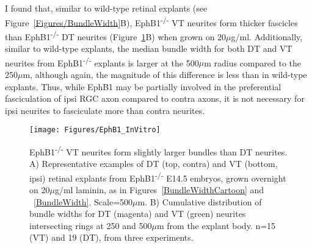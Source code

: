 I found that, similar to wild-type retinal explants (see Figure~\ref{Figures/BundleWidth}B), EphB1\textsuperscript{-/-} VT neurites form thicker fascicles than EphB1\textsuperscript{-/-} DT neurites (Figure~\ref{EphB1InVitro}B) when grown on 20$\mu$g/ml.
Additionally, similar to wild-type explants, the median bundle width for both DT and VT neurites from EphB1\textsuperscript{-/-} explants is larger at the 500$\mu$m radius compared to the 250$\mu$m, although again, the magnitude of this difference is less than in wild-type explants.
Thus, while EphB1 may be partially involved in the preferential fasciculation of ipsi RGC axon compared to contra axons, it is not necessary for ipsi neurites to fasciculate more than contra neurites.
\begin{figure}[hbtp]
    \begin{center}
        \texttt{[image: Figures/EphB1\_InVitro]}
        \caption[EphB1\textsuperscript{-/-} VT neurites form slightly larger bundles than DT neurites.]
        {EphB1\textsuperscript{-/-} VT neurites form slightly larger bundles than DT neurites.
        A) Representative examples of DT (top, contra) and VT (bottom, ipsi) retinal explants from EphB1\textsuperscript{-/-} E14.5 embryos, grown overnight on 20$\mu$g/ml laminin, as in Figures~\ref{BundleWidthCartoon} and ~\ref{BundleWidth}.
        Scale=500$\mu$m.
        B) Cumulative distribution of bundle widths for DT (magenta) and VT (green) neurites intersecting rings at 250 and 500$\mu$m from the explant body.
        n=15 (VT) and 19 (DT), from three experiments.
        }
        \label{EphB1InVitro}
    \end{center}
\end{figure}
